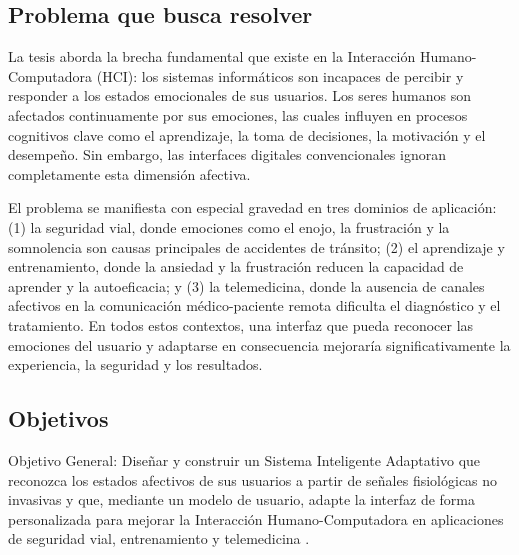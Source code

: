 \subsection{Problema que busca resolver}
La tesis aborda la brecha fundamental que existe en la Interacción Humano-Computadora (HCI): los sistemas informáticos son incapaces de percibir y responder a los estados emocionales de sus usuarios. Los seres humanos son afectados continuamente por sus emociones, las cuales influyen en procesos cognitivos clave como el aprendizaje, la toma de decisiones, la motivación y el desempeño. Sin embargo, las interfaces digitales convencionales ignoran completamente esta dimensión afectiva.

El problema se manifiesta con especial gravedad en tres dominios de aplicación: (1) la seguridad vial, donde emociones como el enojo, la frustración y la somnolencia son causas principales de accidentes de tránsito; (2) el aprendizaje y entrenamiento, donde la ansiedad y la frustración reducen la capacidad de aprender y la autoeficacia; y (3) la telemedicina, donde la ausencia de canales afectivos en la comunicación médico-paciente remota dificulta el diagnóstico y el tratamiento. En todos estos contextos, una interfaz que pueda reconocer las emociones del usuario y adaptarse en consecuencia mejoraría significativamente la experiencia, la seguridad y los resultados.

\subsection{Objetivos}

Objetivo General: Diseñar y construir un Sistema Inteligente Adaptativo que reconozca los estados afectivos de sus usuarios a partir de señales fisiológicas no invasivas y que, mediante un modelo de usuario, adapte la interfaz de forma personalizada para mejorar la Interacción Humano-Computadora en aplicaciones de seguridad vial, entrenamiento y telemedicina \cite{nasoz2004}.


